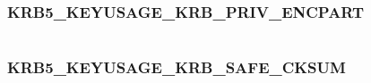 \documentclass[letterpaper,10pt,english]{sphinxmanual}
\begin{document}
\begin{fulllineitems}
\label{appdev/refs/macros/KRB5_KEYUSAGE_KRB_ERROR_CKSUM:KRB5_KEYUSAGE_KRB_ERROR_CKSUM}
\end{fulllineitems}


\begin{tabulary}{\linewidth}{|L|L|}
\hline

 & 
\\\hline
\end{tabulary}



\subsubsection{KRB5\_KEYUSAGE\_KRB\_PRIV\_ENCPART}
\label{appdev/refs/macros/KRB5_KEYUSAGE_KRB_PRIV_ENCPART:krb5-keyusage-krb-priv-encpart}\label{appdev/refs/macros/KRB5_KEYUSAGE_KRB_PRIV_ENCPART:krb5-keyusage-krb-priv-encpart-data}\label{appdev/refs/macros/KRB5_KEYUSAGE_KRB_PRIV_ENCPART::doc}

\begin{fulllineitems}
\label{appdev/refs/macros/KRB5_KEYUSAGE_KRB_PRIV_ENCPART:KRB5_KEYUSAGE_KRB_PRIV_ENCPART}
\end{fulllineitems}


\begin{tabulary}{\linewidth}{|L|L|}
\hline

 & 
\\\hline
\end{tabulary}



\subsubsection{KRB5\_KEYUSAGE\_KRB\_SAFE\_CKSUM}
\label{appdev/refs/macros/KRB5_KEYUSAGE_KRB_SAFE_CKSUM:krb5-keyusage-krb-safe-cksum-data}\label{appdev/refs/macros/KRB5_KEYUSAGE_KRB_SAFE_CKSUM:krb5-keyusage-krb-safe-cksum}\label{appdev/refs/macros/KRB5_KEYUSAGE_KRB_SAFE_CKSUM::doc}

\begin{fulllineitems}
\label{appdev/refs/macros/KRB5_KEYUSAGE_KRB_SAFE_CKSUM:KRB5_KEYUSAGE_KRB_SAFE_CKSUM}
\end{fulllineitems}
\end{document}
